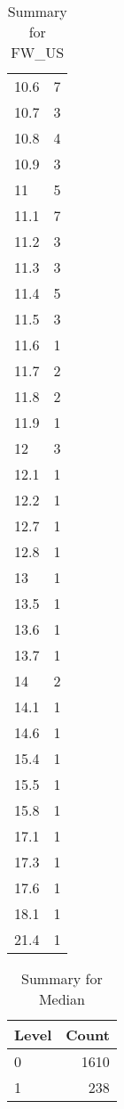 \begin{table}[ht]
\begin{tabular}{lr}
  10.6 &   7 \\ 
  10.7 &   3 \\ 
  10.8 &   4 \\ 
  10.9 &   3 \\ 
  11 &   5 \\ 
  11.1 &   7 \\ 
  11.2 &   3 \\ 
  11.3 &   3 \\ 
  11.4 &   5 \\ 
  11.5 &   3 \\ 
  11.6 &   1 \\ 
  11.7 &   2 \\ 
  11.8 &   2 \\ 
  11.9 &   1 \\ 
  12 &   3 \\ 
  12.1 &   1 \\ 
  12.2 &   1 \\ 
  12.7 &   1 \\ 
  12.8 &   1 \\ 
  13 &   1 \\ 
  13.5 &   1 \\ 
  13.6 &   1 \\ 
  13.7 &   1 \\ 
  14 &   2 \\ 
  14.1 &   1 \\ 
  14.6 &   1 \\ 
  15.4 &   1 \\ 
  15.5 &   1 \\ 
  15.8 &   1 \\ 
  17.1 &   1 \\ 
  17.3 &   1 \\ 
  17.6 &   1 \\ 
  18.1 &   1 \\ 
  21.4 &   1 \\ 
   \hline
\end{tabular}
\caption{Summary for FW_US} 
\label{tab: FW_US}
\end{table}
\begin{table}[ht]
\centering
\begin{tabular}{lr}
  \hline
Level & Count \\ 
  \hline
0 & 1610 \\ 
  1 & 238 \\ 
   \hline
\end{tabular}
\caption{Summary for Median} 
\label{tab: Median}
\end{table}
